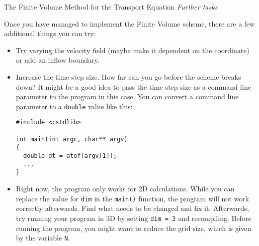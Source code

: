 \documentclass[12pt,a4paper]{article}
\begin{document}
\begin{Exercise}{The Finite Volume Method for the Transport Equation}
 \emph{Further tasks}

  Once you have managed to implement the Finite Volume scheme, there are a few additional
  things you can try:

  \begin{itemize}
  \item Try varying the velocity field (maybe make it dependent on the coordinate) or add an inflow
  boundary.
  \item Increase the time step size. How far can you go before the scheme breaks down? It might be a good
  idea to pass the time step size as a command line parameter to the program in this case. You can convert
  a command line parameter to a \lstinline!double! value like this:
\begin{lstlisting}
#include <cstdlib>

int main(int argc, char** argv)
{
  double dt = atof(argv[1]);
  ...
}
\end{lstlisting}

  \item Right now, the program only works for 2D calculations. While you can replace the value for
  \lstinline!dim! in the \lstinline!main()! function, the program will not work correctly afterwards. Find
  what needs to be changed and fix it. Afterwards, try running your program in 3D by setting \lstinline!dim = 3!
  and recompiling. Before running the program, you might want to reduce the grid size, which is given by the
  variable \lstinline!N!.

  \end{itemize}
\end{Exercise}
\end{document}
